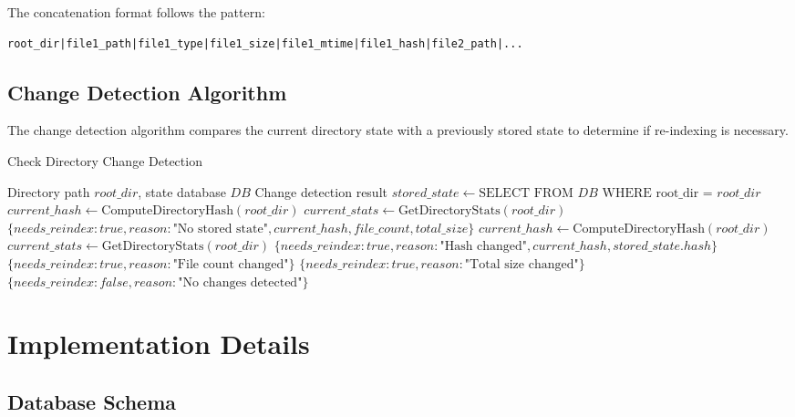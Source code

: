 \documentclass[11pt,a4paper]{article}
\begin{document}
The concatenation format follows the pattern:
\begin{lstlisting}
root_dir|file1_path|file1_type|file1_size|file1_mtime|file1_hash|file2_path|...
\end{lstlisting}

\subsection{Change Detection Algorithm}

The change detection algorithm compares the current directory state with a previously stored state to determine if re-indexing is necessary.

\begin{algorithm}[H]
\caption{Check Directory Change Detection}
\begin{algorithmic}[1]
\REQUIRE Directory path $root\_dir$, state database $DB$
\ENSURE Change detection result
\STATE $stored\_state \leftarrow \text{SELECT FROM } DB \text{ WHERE root\_dir = } root\_dir$
    \STATE $current\_hash \leftarrow \text{ComputeDirectoryHash}(root\_dir)$
    \STATE $current\_stats \leftarrow \text{GetDirectoryStats}(root\_dir)$
    \RETURN $\{needs\_reindex: true, reason: \text{"No stored state"}, current\_hash, file\_count, total\_size\}$
\ENDIF
\STATE $current\_hash \leftarrow \text{ComputeDirectoryHash}(root\_dir)$
\STATE $current\_stats \leftarrow \text{GetDirectoryStats}(root\_dir)$
    \RETURN $\{needs\_reindex: true, reason: \text{"Hash changed"}, current\_hash, stored\_state.hash\}$
    \RETURN $\{needs\_reindex: true, reason: \text{"File count changed"}\}$
    \RETURN $\{needs\_reindex: true, reason: \text{"Total size changed"}\}$
\ELSE
    \RETURN $\{needs\_reindex: false, reason: \text{"No changes detected"}\}$
\ENDIF
\end{algorithmic}
\end{algorithm}

\section{Implementation Details}

\subsection{Database Schema}
\end{document}
